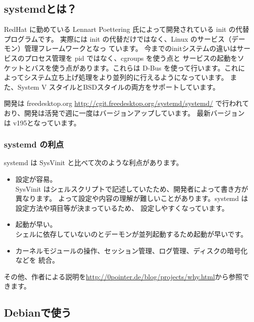 \documentclass[mingoth,a4paper]{jsarticle}
\begin{document}
\subsection{systemdとは？}

RedHat に勤めている Lennart Poettering 氏によって開発されている init の代替プログラムです。
実際には init の代替だけではなく、Linux のサービス（デーモン）管理フレームワークとなっ
ています。
今までのinitシステムの違いはサービスのプロセス管理を pid ではなく、cgroups を使う点と
サービスの起動をソケットとバスを使う点があります。これらは D-Bus を使って行います。これによってシステム立ち上げ処理をより並列的に行えるようになっています。
また、System V スタイルとBSDスタイルの両方をサポートしています。

開発は freedesktop.org
\url{http://cgit.freedesktop.org/systemd/systemd/}
で行われており、開発は活発で週に一度はバージョンアップしています。
最新バージョンは v195となっています。

\subsubsection{systemd の利点}
systemd は SysVinit と比べて次のような利点があります。

\begin{itemize}
\item 設定が容易。\\
SysVinit はシェルスクリプトで記述していたため、開発者によって書き方が異なります。
よって設定や内容の理解が難しいことがあります。systemd は設定方法や項目等が決まっているため、
設定しやすくなっています。

\item 起動が早い。 \\
シェルに依存していないのとデーモンが並列起動するため起動が早いです。

\item カーネルモジュールの操作、セッション管理、ログ管理、ディスクの暗号化などを
統合。

\end{itemize}

その他、作者による説明を\url{http://0pointer.de/blog/projects/why.html}から参照できます。

\subsection{Debianで使う}
\end{document}
